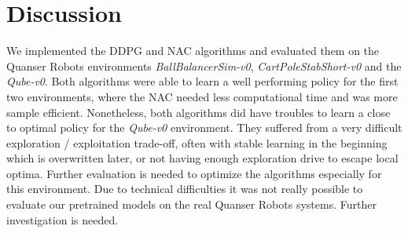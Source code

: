 \section{Discussion}
We implemented the DDPG and NAC algorithms and evaluated them on the Quanser Robots environments \textit{BallBalancerSim-v0}, \textit{CartPoleStabShort-v0} and the \textit{Qube-v0}. Both algorithms were able to learn a well performing policy for the first two environments, where the NAC needed less computational time and was more sample efficient. Nonetheless, both algorithms did have troubles to learn a close to optimal policy for the \textit{Qube-v0} environment. They suffered from a very difficult exploration / exploitation trade-off, often with stable learning in the beginning which is overwritten later, or not having enough exploration drive to escape local optima. Further evaluation is needed to optimize the algorithms especially for this environment. Due to technical difficulties it was not really possible to evaluate our pretrained models on the real Quanser Robots systems. Further investigation is needed.
\label{sec:conclusion}






